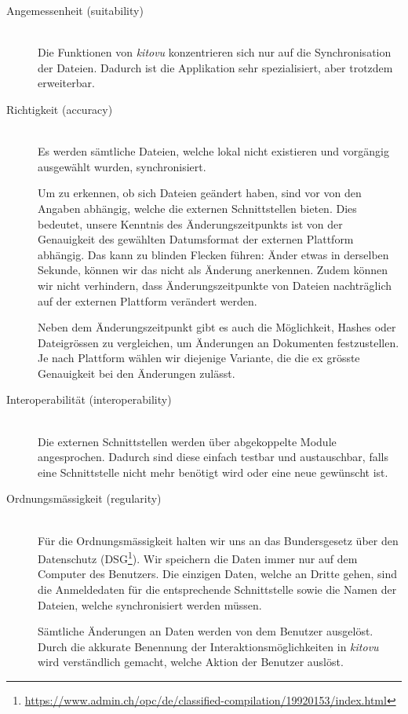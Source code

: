 \documentclass[a4paper]{article}
\begin{document}
\begin{description}
  \item[Angemessenheit (suitability)] \strut \\
    Die Funktionen von \emph{kitovu} konzentrieren sich nur auf die Synchronisation der Dateien.
    Dadurch ist die Applikation sehr spezialisiert, aber trotzdem erweiterbar.
  \item[Richtigkeit (accuracy)] \strut \\
    Es werden sämtliche Dateien, welche lokal nicht existieren und vorgängig ausgewählt wurden, synchronisiert.

    Um zu erkennen, ob sich Dateien geändert haben, sind vor von den Angaben abhängig, welche die externen Schnittstellen bieten.
    Dies bedeutet, unsere Kenntnis des Änderungszeitpunkts ist von der Genauigkeit des gewählten Datumsformat der externen Plattform abhängig. Das kann zu blinden Flecken führen: Änder etwas in derselben Sekunde, können wir das nicht als Änderung anerkennen. Zudem können wir nicht verhindern, dass Änderungszeitpunkte von Dateien nachträglich auf der externen Plattform verändert werden.
    
    Neben dem Änderungszeitpunkt gibt es auch die Möglichkeit, Hashes oder Dateigrössen zu vergleichen, um Änderungen an Dokumenten festzustellen. Je nach Plattform wählen wir diejenige Variante, die die ex grösste Genauigkeit bei den Änderungen zulässt.
  \item[Interoperabilität (interoperability)] \strut \\
    Die externen Schnittstellen werden über abgekoppelte Module angesprochen.
    Dadurch sind diese einfach testbar und austauschbar, falls eine Schnittstelle nicht mehr benötigt wird oder eine neue gewünscht ist.
  \item[Ordnungsmässigkeit (regularity)] \strut \\
    Für die Ordnungsmässigkeit halten wir uns an das Bundersgesetz über den Datenschutz (DSG\footnote{\url{https://www.admin.ch/opc/de/classified-compilation/19920153/index.html}}).
    Wir speichern die Daten immer nur auf dem Computer des Benutzers.
    Die einzigen Daten, welche an Dritte gehen, sind die Anmeldedaten für die entsprechende Schnittstelle sowie die Namen der Dateien, welche synchronisiert werden müssen.

    Sämtliche Änderungen an Daten werden von dem Benutzer ausgelöst. Durch die akkurate Benennung der Interaktionsmöglichkeiten in \emph{kitovu} wird verständlich gemacht, welche Aktion der Benutzer auslöst.


\end{description}
\end{document}
